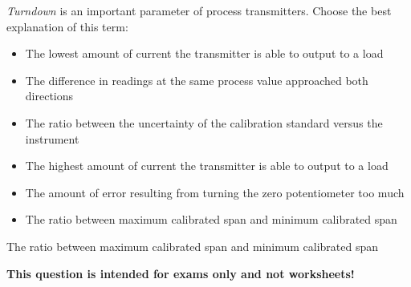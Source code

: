 

{\it Turndown} is an important parameter of process transmitters.  Choose the best explanation of this term:

\vskip 10pt

\begin{itemize}
\item{} The lowest amount of current the transmitter is able to output to a load
\vskip 10pt
\item{} The difference in readings at the same process value approached both directions
\vskip 10pt
\item{} The ratio between the uncertainty of the calibration standard versus the instrument
\vskip 10pt
\item{} The highest amount of current the transmitter is able to output to a load
\vskip 10pt
\item{} The amount of error resulting from turning the zero potentiometer too much
\vskip 10pt
\item{} The ratio between maximum calibrated span and minimum calibrated span
\end{itemize}







The ratio between maximum calibrated span and minimum calibrated span







{\bf This question is intended for exams only and not worksheets!}



